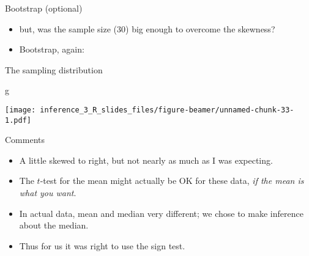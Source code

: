 \documentclass[
  ignorenonframetext,
]{beamer}
\newenvironment{Shaded}{\begin{snugshade}}{\end{snugshade}}
\newcommand{\DataTypeTok}[1]{\textcolor[rgb]{0.13,0.29,0.53}{#1}}
\newcommand{\DecValTok}[1]{\textcolor[rgb]{0.00,0.00,0.81}{#1}}
\newcommand{\KeywordTok}[1]{\textcolor[rgb]{0.13,0.29,0.53}{\textbf{#1}}}
\newcommand{\NormalTok}[1]{#1}
\newcommand{\OperatorTok}[1]{\textcolor[rgb]{0.81,0.36,0.00}{\textbf{#1}}}
\newcommand{\OtherTok}[1]{\textcolor[rgb]{0.56,0.35,0.01}{#1}}
\newcommand{\StringTok}[1]{\textcolor[rgb]{0.31,0.60,0.02}{#1}}
\providecommand{\tightlist}{%
  \setlength{\itemsep}{0pt}\setlength{\parskip}{0pt}}
\begin{document}
\begin{frame}[fragile]{Bootstrap (optional)}
\protect\hypertarget{bootstrap-optional}{}
\begin{itemize}
\tightlist
\item
  but, was the sample size (30) big enough to overcome the skewness?
\item
  Bootstrap, again:
\end{itemize}

\begin{Shaded}
\end{Shaded}
\end{frame}

\begin{frame}[fragile]{The sampling distribution}
\protect\hypertarget{the-sampling-distribution}{}
\begin{Shaded}
\begin{Highlighting}[]
\NormalTok{g}
\end{Highlighting}
\end{Shaded}

\texttt{[image: inference\_3\_R\_slides\_files/figure-beamer/unnamed-chunk-33-1.pdf]}
\end{frame}

\begin{frame}{Comments}
\protect\hypertarget{comments-1}{}
\begin{itemize}
\tightlist
\item
  A little skewed to right, but not nearly as much as I was expecting.
\item
  The \(t\)-test for the mean might actually be OK for these data,
  \emph{if the mean is what you want}.
\item
  In actual data, mean and median very different; we chose to make
  inference about the median.
\item
  Thus for us it was right to use the sign test.
\end{itemize}
\end{frame}
\end{document}
